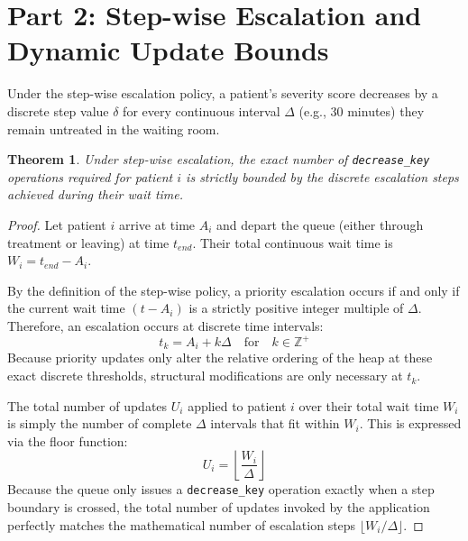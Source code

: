 \documentclass[12pt]{article}
\newtheorem{theorem}{Theorem}
\begin{document}
\section*{Part 2: Step-wise Escalation and Dynamic Update Bounds}

Under the step-wise escalation policy, a patient's severity score decreases by a discrete step value $\delta$ for every continuous interval $\Delta$ (e.g., 30 minutes) they remain untreated in the waiting room.

\begin{theorem}
Under step-wise escalation, the exact number of \texttt{decrease\_key} operations required for patient $i$ is strictly bounded by the discrete escalation steps achieved during their wait time.
\end{theorem}

\begin{proof}
Let patient $i$ arrive at time $A_i$ and depart the queue (either through treatment or leaving) at time $t_{end}$. Their total continuous wait time is $W_i = t_{end} - A_i$.

By the definition of the step-wise policy, a priority escalation occurs if and only if the current wait time $(t - A_i)$ is a strictly positive integer multiple of $\Delta$. Therefore, an escalation occurs at discrete time intervals:
\begin{equation}
    t_k = A_i + k\Delta \quad \text{for} \quad k \in \mathbb{Z}^+
\end{equation}
Because priority updates only alter the relative ordering of the heap at these exact discrete thresholds, structural modifications are only necessary at $t_k$. 

The total number of updates $U_i$ applied to patient $i$ over their total wait time $W_i$ is simply the number of complete $\Delta$ intervals that fit within $W_i$. This is expressed via the floor function:
\begin{equation}
    U_i = \left\lfloor \frac{W_i}{\Delta} \right\rfloor
\end{equation}
Because the queue only issues a \texttt{decrease\_key} operation exactly when a step boundary is crossed, the total number of updates invoked by the application perfectly matches the mathematical number of escalation steps $\lfloor W_i / \Delta \rfloor$. 
\end{proof}
\end{document}
